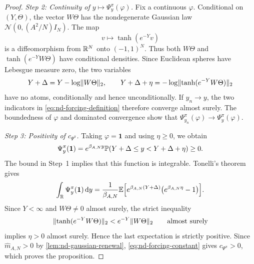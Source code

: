 \documentclass[11pt,reqno,a4paper]{article}
\newcommand{\Pp}{\P}
\newcommand{\Ee}{\E}
\begin{document}
\begin{proof}
  \emph{Step 2: Continuity of $y\mapsto\Psi_y^\pi(\varphi)$.}
  Fix a continuous $\varphi$. Conditional on $(Y,\Theta)$, the vector
  $W\Theta$ has the nondegenerate Gaussian law
  $\mathcal N(0,(A^2/N)I_N)$. The map
  \begin{equation*}
    v\longmapsto\tanh(e^{-Y}v)
  \end{equation*}
  is a diffeomorphism from $\mathbb{R}^N$ onto $(-1,1)^N$. Thus both $W\Theta$ and
  $\tanh(e^{-Y}W\Theta)$ have conditional densities. Since Euclidean spheres
  have Lebesgue measure zero, the two variables
  \begin{equation*}
    Y+\Delta=Y-\log\lVert W\Theta\rVert_2,
    \qquad
    Y+\Delta+\eta
    =-\log\lVert\tanh(e^{-Y}W\Theta)\rVert_2
  \end{equation*}
  have no atoms, conditionally and hence unconditionally. If $y_n\to y$, the
  two indicators in \cref{eq:nd-forcing-definition} therefore converge almost
  surely. The boundedness of $\varphi$ and dominated convergence show that
  $\Psi_{y_n}^\pi(\varphi)\to\Psi_y^\pi(\varphi)$.

  \emph{Step 3: Positivity of $c_{\Psi^\pi}$.}
  Taking $\varphi=\mathbf 1$ and using $\eta\geq0$, we obtain
  \begin{equation*}
    \Psi_y^\pi(\mathbf 1)
    =
    e^{\beta_{A,N}y}
    \Pp\left(Y+\Delta\leq y<Y+\Delta+\eta\right)
    \geq0 .
  \end{equation*}
  The bound in Step~1 implies that this function is integrable. Tonelli's
  theorem gives
  \begin{equation*}
    \int_\R\Psi_y^\pi(\mathbf 1)\,\mathrm{d}y
    =
    \frac1{\beta_{A,N}}
    \Ee\left[
      e^{\beta_{A,N}(Y+\Delta)}
      \left(e^{\beta_{A,N}\eta}-1\right)
    \right].
  \end{equation*}
  Since $Y<\infty$ and $W\Theta\neq0$ almost surely, the strict inequality
  \begin{equation*}
    \lVert\tanh(e^{-Y}W\Theta)\rVert_2
    <
    e^{-Y}\lVert W\Theta\rVert_2
    \qquad\mbox{almost surely}
  \end{equation*}
  implies $\eta>0$ almost surely. Hence the last expectation is strictly
  positive. Since $\widehat m_{A,N}>0$ by
  \cref{lem:nd-gaussian-renewal}, \cref{eq:nd-forcing-constant} gives
  $c_{\Psi^\pi}>0$, which proves the proposition.
\end{proof}
\end{document}
